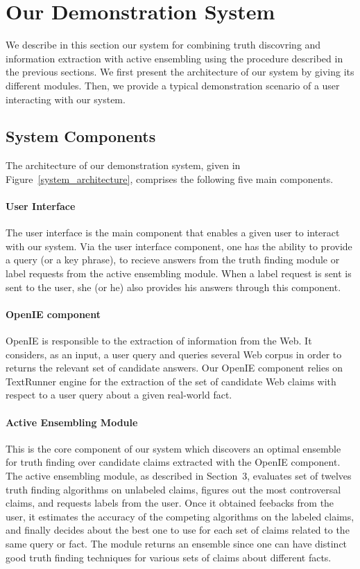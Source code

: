 \section{Our Demonstration System}\label{demonstration}
We describe in this section our system for 
combining truth discovring and information
extraction with active ensembling using the procedure described
in the previous sections. We first 
present the architecture of our system by
giving its different modules. Then, we provide
a typical demonstration scenario of a user interacting
with our system.


\subsection{System Components}
The architecture of our demonstration system, given in
Figure~\ref{system_architecture}, comprises the following
five main components.

\paragraph*{User Interface}
The user interface is the main component that enables a given user 
to interact with our system. Via the user interface component, 
one has the ability to provide a query (or a key phrase), to
recieve answers from the truth finding module or  label requests
from the active ensembling module. When a label request is sent 
is sent to the user, she (or he) also provides his answers through 
this component.


\paragraph*{OpenIE component} OpenIE is responsible to the extraction 
of information from the Web. It considers, as an input, a user query and queries
several Web corpus in order to returns the relevant set of candidate answers. Our
OpenIE component relies on TextRunner engine for the extraction of the set of candidate
Web claims with respect to a user query about a given real-world fact.

\paragraph*{Active Ensembling Module} This is the core component of our system which discovers
an optimal ensemble for truth finding over candidate claims extracted with the OpenIE 
component. The active ensembling module, as described in Section~3, evaluates set of twelves
truth finding algorithms on unlabeled claims, figures out the most controversal claims, and requests
labels from the user. Once it obtained feebacks from the user, it estimates the accuracy of the competing
algorithms on the labeled claims, and finally decides about the best one to use for each set of claims related 
to the same query or fact. The module returns an ensemble since one can have distinct good truth finding techniques
for various sets of claims about different facts.

